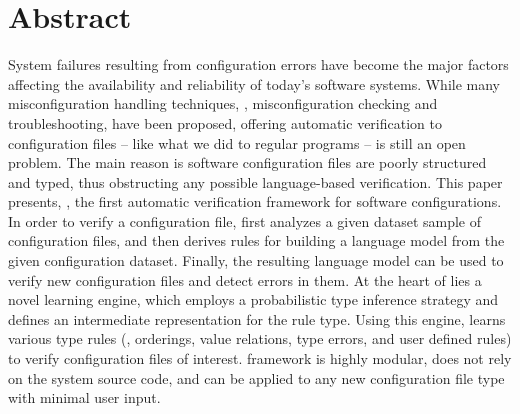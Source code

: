 
\section*{Abstract}

System failures resulting from configuration errors 
have become the major factors affecting the availability and
reliability of today's software systems.
While many misconfiguration handling techniques,
\eg, misconfiguration checking and troubleshooting, have been proposed, 
offering automatic verification to configuration files -- like
what we did to regular programs -- is still an open problem.
The main reason is software configuration files are poorly structured 
and typed, thus obstructing any possible language-based verification. 
This paper presents, \app, the first automatic verification framework for
software configurations.
In order to verify a configuration file,
\app first analyzes a given dataset sample of configuration files, 
and then derives rules for building a language model from 
the given configuration dataset. 
Finally, the resulting language model can be used
to verify new configuration files and detect errors in them.
At the heart of \app lies a novel learning engine, 
which employs a probabilistic type inference strategy and
defines an intermediate representation for the rule type.
Using this engine, \app learns various type rules (\eg, orderings,
value relations, type errors, and user defined rules)
to verify configuration files of interest.
\app framework is highly modular, 
does not rely on the system source code, and
can be applied to any new configuration file type with minimal user input.  

